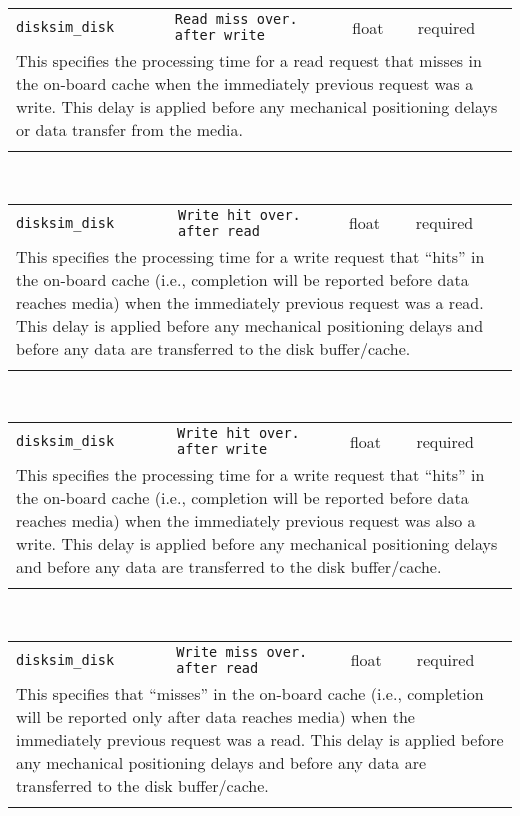 \noindent 
\begin{tabular}{|p{\lpmodwidth}|p{\lpnamewidth}|p{0.5in}|p{0.5in}|}
\cline{1-4}
\texttt{disksim\_disk} & \texttt{Read miss over. after write} & float & required \\ 
\cline{1-4}
\multicolumn{4}{|p{6in}|}{
This specifies the processing time for a read request that misses in the
on-board cache when the immediately previous request was a write.
This delay is applied before any mechanical positioning delays or data
transfer from the media.
}\\ 
\cline{1-4}
\multicolumn{4}{p{5in}}{}\\
\end{tabular}\\ 
\noindent 
\begin{tabular}{|p{\lpmodwidth}|p{\lpnamewidth}|p{0.5in}|p{0.5in}|}
\cline{1-4}
\texttt{disksim\_disk} & \texttt{Write hit over. after read} & float & required \\ 
\cline{1-4}
\multicolumn{4}{|p{6in}|}{
This specifies the processing time for a write request that ``hits'' in
the on-board cache (i.e., completion will be reported before data
reaches media) when the immediately previous request was a read. This
delay is applied before any mechanical positioning delays and before
any data are transferred to the disk buffer/cache.
}\\ 
\cline{1-4}
\multicolumn{4}{p{5in}}{}\\
\end{tabular}\\ 
\noindent 
\begin{tabular}{|p{\lpmodwidth}|p{\lpnamewidth}|p{0.5in}|p{0.5in}|}
\cline{1-4}
\texttt{disksim\_disk} & \texttt{Write hit over. after write} & float & required \\ 
\cline{1-4}
\multicolumn{4}{|p{6in}|}{
This specifies the processing time for a write request that ``hits'' in
the on-board cache (i.e., completion will be reported before data
reaches media) when the immediately previous request was also a write.
This delay is applied before any mechanical positioning delays and
before any data are transferred to the disk buffer/cache.
}\\ 
\cline{1-4}
\multicolumn{4}{p{5in}}{}\\
\end{tabular}\\ 
\noindent 
\begin{tabular}{|p{\lpmodwidth}|p{\lpnamewidth}|p{0.5in}|p{0.5in}|}
\cline{1-4}
\texttt{disksim\_disk} & \texttt{Write miss over. after read} & float & required \\ 
\cline{1-4}
\multicolumn{4}{|p{6in}|}{
This specifies that ``misses'' in the on-board cache (i.e., completion will
be reported only after data reaches media) when the immediately
previous request was a read. This delay is applied before any
mechanical positioning delays and before any data are transferred to
the disk buffer/cache.
}\\ 
\cline{1-4}
\multicolumn{4}{p{5in}}{}\\
\end{tabular}\\ 
